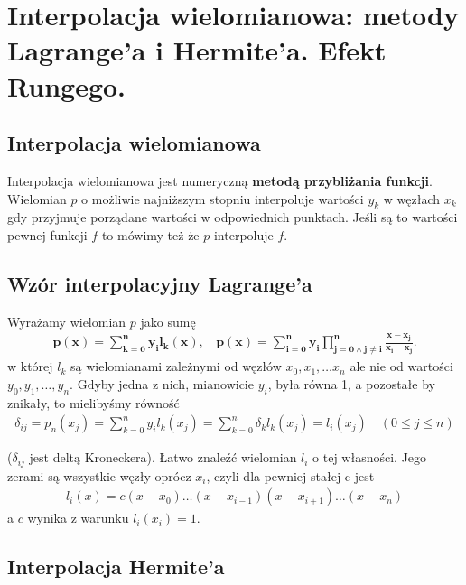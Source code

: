 \documentclass[main.tex]{subfiles}
\begin{document}
    \newpage


    \section{Interpolacja wielomianowa: metody Lagrange'a i Hermite'a. Efekt Rungego.}

    \subsection{Interpolacja wielomianowa}

    Interpolacja wielomianowa jest numeryczną \textbf{metodą przybliżania funkcji}.
    Wielomian $p$ o możliwie najniższym stopniu interpoluje wartości $y_k$ w węzłach $x_k$ gdy przyjmuje porządane wartości
    w odpowiednich punktach. Jeśli są to wartości pewnej funkcji $f$ to mówimy też że $p$ interpoluje $f$.

    \subsection{Wzór interpolacyjny Lagrange'a}

    Wyrażamy wielomian $p$ jako sumę
    \begin{align*}
        \mathbf{p(x)=\sum _{k=0}^{n}y_{i}l_k(x), ~~~~
        p(x)=\sum _{i=0}^{n}y_{i}\prod _{j=0\land j\neq i}^{n}{\frac {x-x_{j}}{x_{i}-x_{j}}}}.
    \end{align*}
    w której $l_k$ są wielomianami zależnymi od węzłów $x_0,x_1, \dots x_n$ ale nie od wartości $y_0,y_1, \dots ,y_n$.
    Gdyby jedna z nich, mianowicie $y_i$, była równa 1, a pozostałe by znikały, to mielibyśmy równość
    \begin{align*}
        \delta_{ij} = p_n(x_j)=\sum _{k=0}^{n}y_{i}l_k(x_j)=\sum _{k=0}^{n}\delta_k l_k (x_j)=l_i(x_j) \quad (0 \leq j \leq n)
    \end{align*}

    ($\delta_{ij}$ jest deltą Kroneckera). Łatwo znaleźć wielomian $l_i$ o tej własności. Jego zerami są wszystkie węzły
    oprócz $x_i$, czyli dla pewniej stałej c jest
    \begin{align*}
        l_i(x)=c(x-x_0)\dots(x-x_{i-1})(x-x_{i+1})\dots(x-x_n)
    \end{align*}
    a $c$ wynika z warunku $l_i(x_i)=1$.


    \subsection{Interpolacja Hermite’a}
\end{document}
